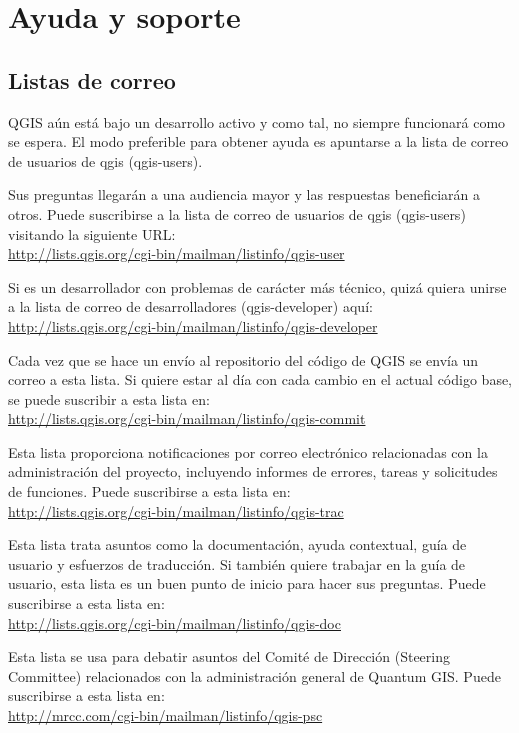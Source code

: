 \section{Ayuda y soporte}\label{label_helpsupport}

\subsection{Listas de correo}
QGIS aún está bajo un desarrollo activo y como tal, no siempre funcionará como se espera. El modo preferible para obtener ayuda es apuntarse a la lista de correo de usuarios de qgis (qgis-users).

Sus preguntas llegarán a una audiencia mayor y las respuestas beneficiarán a otros. Puede suscribirse a la lista de correo de usuarios de qgis (qgis-users) visitando la siguiente URL: \\
\url{http://lists.qgis.org/cgi-bin/mailman/listinfo/qgis-user}

Si es un desarrollador con problemas de carácter más técnico, quizá quiera unirse a la lista de correo de desarrolladores (qgis-developer) aquí:\\
\url{http://lists.qgis.org/cgi-bin/mailman/listinfo/qgis-developer}

Cada vez que se hace un envío al repositorio del código de QGIS se envía un correo a esta lista. Si quiere estar al día con cada cambio en el actual código base, se puede suscribir a esta lista en:\\
\url{http://lists.qgis.org/cgi-bin/mailman/listinfo/qgis-commit}

Esta lista proporciona notificaciones por correo electrónico relacionadas con la administración del proyecto, incluyendo informes de errores, tareas y solicitudes de funciones. Puede suscribirse a esta lista en:\\
\url{http://lists.qgis.org/cgi-bin/mailman/listinfo/qgis-trac}

Esta lista trata asuntos como la documentación, ayuda contextual, guía de usuario y esfuerzos de traducción. Si también quiere trabajar en la guía de usuario, esta lista es un buen punto de inicio para hacer sus preguntas. Puede suscribirse a esta lista en:\\
\url{http://lists.qgis.org/cgi-bin/mailman/listinfo/qgis-doc}

Esta lista se usa para debatir asuntos del Comité de Dirección (Steering Committee) relacionados con la administración general de Quantum GIS. Puede suscribirse a esta lista en:\\
\url{http://mrcc.com/cgi-bin/mailman/listinfo/qgis-psc}

